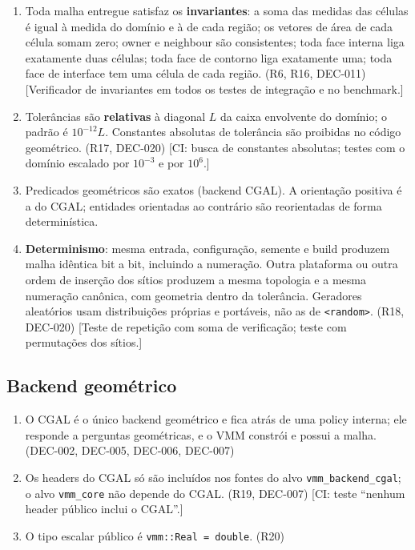 \begin{enumerate}
  \item Toda malha entregue satisfaz os \textbf{invariantes}: a soma das medidas das células é igual à medida
        do domínio e à de cada região; os vetores de área de cada célula somam zero; owner e neighbour são
        consistentes; toda face interna liga exatamente duas células; toda face de contorno liga exatamente uma;
        toda face de interface tem uma célula de cada região. (R6, R16, DEC-011)
        [Verificador de invariantes em todos os testes de integração e no benchmark.]
  \item Tolerâncias são \textbf{relativas} à diagonal $L$ da caixa envolvente do domínio; o padrão é
        $10^{-12}L$. Constantes absolutas de tolerância são proibidas no código geométrico. (R17, DEC-020)
        [CI: busca de constantes absolutas; testes com o domínio escalado por $10^{-3}$ e por $10^{6}$.]
  \item Predicados geométricos são exatos (backend CGAL). A orientação positiva é a do CGAL; entidades
        orientadas ao contrário são reorientadas de forma determinística.
  \item \textbf{Determinismo}: mesma entrada, configuração, semente e build produzem malha idêntica bit a bit,
        incluindo a numeração. Outra plataforma ou outra ordem de inserção dos sítios produzem a mesma topologia
        e a mesma numeração canônica, com geometria dentro da tolerância. Geradores aleatórios usam distribuições
        próprias e portáveis, não as de \texttt{<random>}. (R18, DEC-020)
        [Teste de repetição com soma de verificação; teste com permutações dos sítios.]
\end{enumerate}

\subsection{Backend geométrico}

\begin{enumerate}
  \item O CGAL é o único backend geométrico e fica atrás de uma policy interna; ele responde a perguntas
        geométricas, e o VMM constrói e possui a malha. (DEC-002, DEC-005, DEC-006, DEC-007)
  \item Os headers do CGAL só são incluídos nos fontes do alvo \texttt{vmm\_backend\_cgal}; o alvo
        \texttt{vmm\_core} não depende do CGAL. (R19, DEC-007)
        [CI: teste ``nenhum header público inclui o CGAL''.]
  \item O tipo escalar público é \texttt{vmm::Real = double}. (R20)
\end{enumerate}

